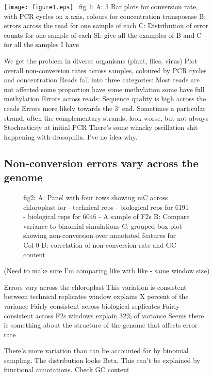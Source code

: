 \documentclass[12pt,longbibliography]{article}
\begin{document}
\begin{figure}
    \texttt{[image: figure1.eps]}
    \
fig 1:
    A: 3 Bar plots for conversion rate, with PCR cycles on x axis, colours for concentration transposase
    B: errors across the read for one sample of each
    C: Distribution of error counts for one sample of each
    SI: give all the examples of B and C for all the samples I have

We get the problem in diverse organisms (plant, flies, virus)
    Plot overall non-conversion rates across samples, coloured by PCR cycles and concentration
Reads fall into three categories:
    Most reads are not affected
    some proportion have some methylation
    some have full methylation
Errors across reads:
    Sequence quality is high across the reads
    Errors more likely towards the 3` end.
    Sometimes a particular strand, often the complementary strands, look worse, but not always
        Stochasticity at initial PCR
    There's some whacky oscillation shit happening with drosophila. I've no idea why.

\subsection{Non-conversion errors vary across the genome}

\begin{figure}
    fig2:
        A: Panel with four rows showing mC across chloroplast for
            - technical reps
            - biological reps for 6191
            - biological reps for 6046
            - A sample of F2s
        B: Compare variance to binomial simulations
        C: grouped box plot showing non-conversion over annotated features for Col-0
        D: correlation of non-conversion rate and GC content
\end{figure}

(Need to make sure I'm comparing like with like - same window size)

Errors vary across the chloroplast
This variation is consistent between technical replicates
    window explains X percent of the variance
Fairly consistent across biological replicates
Fairly consistent across F2s
    windows explain 32\% of variance
Seems there is something about the structure of the genome that affects error rate

There's more variation than can be accounted for by binomial sampling.
The distribution looks Beta.
This can't be explained by functional annotations.
Check GC content


\end{figure}
\end{document}
